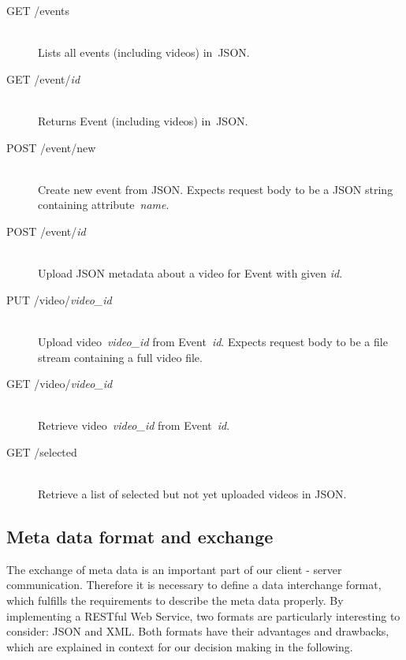 \documentclass[conference]{IEEEtran}
\begin{document}
\begin{description}
	\item[GET /events]\hfill\\
		Lists all events (including videos) in~JSON.
		
	\item[GET /event/\textit{id}]\hfill\\
		Returns Event (including videos) in~JSON.
				
	\item[POST /event/new]\hfill\\
		Create new event from JSON.
		Expects request body to be a JSON string containing attribute~\textit{name}.
		
	\item[POST /event/\textit{id}]\hfill\\
		Upload JSON metadata about a video for Event with given \textit{id}.
		
	\item[PUT /video/\textit{video\_id}]\hfill\\
		Upload video~\textit{video\_id} from Event~\textit{id}.
		Expects request body to be a file stream containing a full video file.
		
	\item[GET /video/\textit{video\_id}]\hfill\\
		Retrieve video~\textit{video\_id} from Event~\textit{id}.
		
	\item[GET /selected]\hfill\\
		Retrieve a list of selected but not yet uploaded videos in JSON.	
		
\end{description}

\subsection{Meta data format and exchange}
The exchange of meta data is an important part of our client - server communication.
Therefore it is necessary to define a data interchange format, which fulfills the requirements to describe the meta data properly.
By implementing a RESTful Web Service, two formats are particularly interesting to consider: JSON and XML.
Both formats have their advantages and drawbacks, which are explained in context for our decision making in the following.
\end{document}
